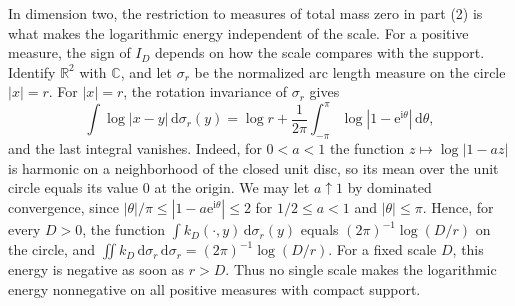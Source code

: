 In dimension two, the restriction to measures of total mass zero in part (2) is what makes the logarithmic energy independent of the scale. For a positive measure, the sign of $I_D$ depends on how the scale compares with the support. Identify $\mathbb R^2$ with $\mathbb C$, and let $\sigma_r$ be the normalized arc length measure on the circle $|x|=r$. For $|x|=r$, the rotation invariance of $\sigma_r$ gives
\[
 \int\log|x-y|\,\mathrm d\sigma_r(y)=\log r+\frac1{2\pi}\int_{-\pi}^{\pi}\log|1-\mathrm e^{\mathrm i\theta}|\,\mathrm d\theta,
\]
and the last integral vanishes. Indeed, for $0<a<1$ the function $z\mapsto\log|1-az|$ is harmonic on a neighborhood of the closed unit disc, so its mean over the unit circle equals its value $0$ at the origin. We may let $a\uparrow1$ by dominated convergence, since $|\theta|/\pi\leq|1-a\mathrm e^{\mathrm i\theta}|\leq2$ for $1/2\leq a<1$ and $|\theta|\leq\pi$. Hence, for every $D>0$, the function $\int k_D(\cdot,y)\,\mathrm d\sigma_r(y)$ equals $(2\pi)^{-1}\log(D/r)$ on the circle, and $\iint k_D\,\mathrm d\sigma_r\,\mathrm d\sigma_r=(2\pi)^{-1}\log(D/r)$. For a fixed scale $D$, this energy is negative as soon as $r>D$. Thus no single scale makes the logarithmic energy nonnegative on all positive measures with compact support.

